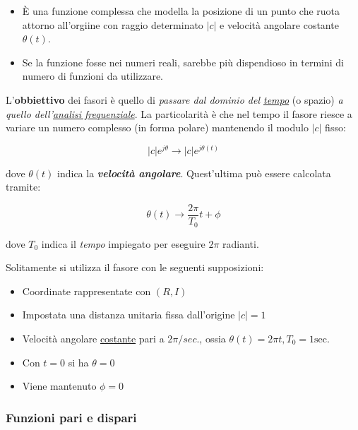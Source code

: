 \documentclass[a4paper]{article}
\begin{document}
	\begin{itemize}
		\item È una funzione complessa che modella la posizione di un punto che ruota attorno all'orgiine con raggio determinato $|c|$ e velocità angolare costante $\theta{(t)}$.
		
		\item Se la funzione fosse nei numeri reali, sarebbe più dispendioso in termini di numero di funzioni da utilizzare.
	\end{itemize}
	
	L'\textbf{obbiettivo} dei fasori è quello di \emph{passare dal dominio del \underline{tempo}} (o spazio) \emph{a quello dell'\underline{analisi frequenziale}}.\newline
	La particolarità è che nel tempo il fasore riesce a variare un numero complesso (in forma polare) mantenendo il modulo $|c|$ fisso:

	\begin{equation*}
		|c| e^{j\theta} \rightarrow |c| e^{j\theta{(t)}}
	\end{equation*}

	\noindent
	dove $\theta{(t)}$ indica la \textbf{\emph{velocità angolare}}. Quest'ultima può essere calcolata tramite:
	
	\begin{equation*}
		\theta{(t)} \longrightarrow \dfrac{2\pi}{T_0} t + \phi
	\end{equation*}

	\noindent
	dove $T_0$ indica il \emph{tempo} impiegato per eseguire $2\pi$ radianti.
	
	Solitamente si utilizza il fasore con le seguenti supposizioni:
	
	\begin{itemize}
		\item[\ding{45}] Coordinate rappresentate con $(R, I)$
		\item[\ding{45}] Impostata una distanza unitaria fissa dall'origine $|c| = 1$
		\item[\ding{45}] Velocità angolare \underline{costante} pari a $2\pi/sec.$, ossia $\theta{(t)} = 2\pi t, T_0 = 1\mathrm{sec.}$
		\item[\ding{45}] Con $t = 0$ si ha $\theta = 0$
		\item[\ding{45}] Viene mantenuto $\phi = 0$
	\end{itemize}

	\newpage
	
	\subsubsection{Funzioni pari e dispari}
	
\end{document}
